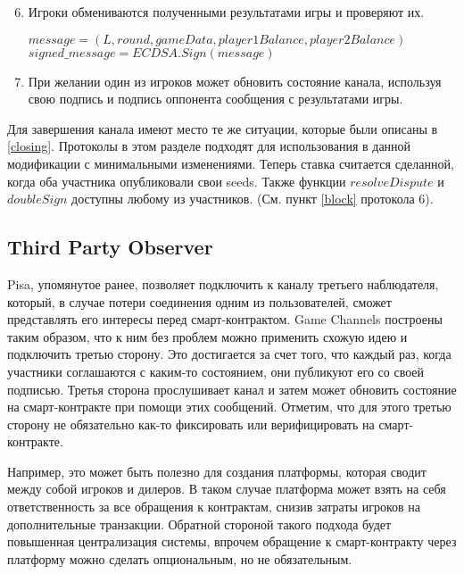 \begin{algorithm}
\begin{enumerate}
\setcounter{enumi}{5}
 \item Игроки обмениваются полученными результатами игры и проверяют их. 
\begin{center}
 $message = (L, round, gameData, player1Balance, player2Balance)$
 $signed\_message = ECDSA.Sign(message)$
\end{center}
\item При желании один из игроков может обновить состояние канала, используя свою подпись и подпись оппонента сообщения с результатами игры.
\end{enumerate}
\end{algorithm}

Для завершения канала имеют место те же ситуации, которые были описаны в \autoref{closing}. Протоколы в этом разделе подходят для использования в данной модификации с минимальными изменениями. Теперь ставка считается сделанной, когда оба участника опубликовали свои seeds. Также функции $resolveDispute$ и $doubleSign$ доступны любому из участников. (См. пункт \ref{block} протокола 6). 

	\subsection{Third Party Observer}
Pisa, упомянутое ранее, позволяет подключить к каналу третьего наблюдателя, который, в случае потери соединения одним из пользователей, сможет представлять его интересы перед смарт-контрактом. Game Channels построены таким образом, что к ним без проблем можно применить схожую идею и подключить третью сторону. Это достигается за счет того, что каждый раз, когда участники соглашаются с каким-то состоянием, они публикуют его со своей подписью. Третья сторона прослушивает канал и затем может обновить состояние на смарт-контракте при помощи этих сообщений. Отметим, что для этого третью сторону не обязательно как-то фиксировать или верифицировать на смарт-контракте. 

Например, это может быть полезно для создания платформы, которая сводит между собой игроков и дилеров. В таком случае платформа может взять на себя ответственность за все обращения к контрактам, снизив затраты игроков на дополнительные транзакции. Обратной стороной такого подхода будет повышенная централизация системы, впрочем обращение к смарт-контракту через платформу можно сделать опциональным, но не обязательным. 
 